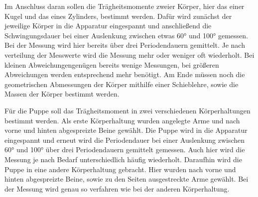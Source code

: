 Im Anschluss daran sollen die Trägheitsmomente zweier Körper, hier das einer Kugel und
das eines Zylinders, bestimmt werden. Dafür wird zunächst der jeweilige Körper in
die Apparatur eingespannt und anschließend die Schwingungsdauer bei einer Auslenkung
zwischen etwas 60° und 100° gemessen. Bei der Messung wird hier bereits über drei
Periodendauern gemittelt. Je nach verteilung der Messwerte wird die Messung mehr
oder weniger oft wiederholt. Bei kleinen Abweichungengenügen bereits wenige Messungen,
bei größeren Abweichungen werden entsprechend mehr benötigt. Am Ende müssen noch die
geometrischen Abmessungen der Körper mithilfe einer Schieblehre, sowie die Massen der
Körper bestimmt werden.

Für die Puppe soll das Trägheitsmoment in zwei verschiedenen Körperhaltungen bestimmt
werden. Als erste Körperhaltung wurden angelegte Arme und nach vorne und hinten
abgespreizte Beine gewählt. Die Puppe wird in die Apparatur eingespannt und erneut
wird die Periodendauer bei einer Auslenkung zwischen 60° und 100° über drei
Periodendauern gemittelt gemessen. Auch hier wird die Messung je nach Bedarf
unterschiedlich häufig wiederholt. Daraufhin wird die Puppe in eine andere
Körperhaltung gebracht. Hier wurden nach vorne und hinten abgespreizte Beine,
sowie zu den Seiten ausgestreckte Arme gewählt. Bei der Messung wird genau so
verfahren wie bei der anderen Körperhaltung.
